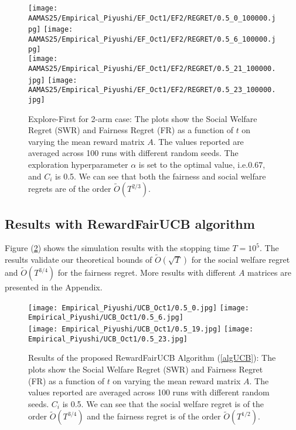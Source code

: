 \begin{figure}[h!]
    \texttt{[image: AAMAS25/Empirical\_Piyushi/EF\_Oct1/EF2/REGRET/0.5\_0\_100000.jpg]}
    \texttt{[image: AAMAS25/Empirical\_Piyushi/EF\_Oct1/EF2/REGRET/0.5\_6\_100000.jpg]}\\
    \texttt{[image: AAMAS25/Empirical\_Piyushi/EF\_Oct1/EF2/REGRET/0.5\_21\_100000.jpg]}
    \texttt{[image: AAMAS25/Empirical\_Piyushi/EF\_Oct1/EF2/REGRET/0.5\_23\_100000.jpg]}
    \caption{Explore-First for 2-arm case: The plots show the Social Welfare Regret (SWR) and Fairness Regret (FR) as a function of $t$ on varying the mean reward matrix $A$. The values reported are averaged across 100 runs with different random seeds. The exploration hyperparameter $\alpha$ is set to the optimal value, i.e.$0.67$, and $C_i$ is 0.5. We can see that both the fairness and social welfare regrets are of the order $\tilde{O}(T^{2/3})$.}
    \label{fig:EF-reg}
\end{figure}

\subsection{Results with RewardFairUCB algorithm}
Figure (\ref{fig:ucb}) shows the simulation results with the stopping time $T=10^5$. The results validate our theoretical bounds of $\tilde{O}(\sqrt{T})$ for the social welfare regret and $\tilde{O}(T^{3/4})$ for the fairness regret. More results with different $A$ matrices are presented in the Appendix.

\begin{figure}[h!]
\texttt{[image: Empirical\_Piyushi/UCB\_Oct1/0.5\_0.jpg]}
\texttt{[image: Empirical\_Piyushi/UCB\_Oct1/0.5\_6.jpg]}\\
\texttt{[image: Empirical\_Piyushi/UCB\_Oct1/0.5\_19.jpg]}
\texttt{[image: Empirical\_Piyushi/UCB\_Oct1/0.5\_23.jpg]}
\vspace{-0.1in}
\caption[short]{Results of the proposed RewardFairUCB Algorithm (\ref{algUCB}): The plots show the Social Welfare Regret (SWR) and Fairness Regret (FR) as a function of $t$ on varying the mean reward matrix $A$. The values reported are averaged across 100 runs with different random seeds. $C_i$ is 0.5. We can see that the social welfare regret is of the order $\tilde{O}(T^{3/4})$ and the fairness regret is of the order $\tilde{O}(T^{1/2})$.}\label{fig:ucb}
\end{figure}

